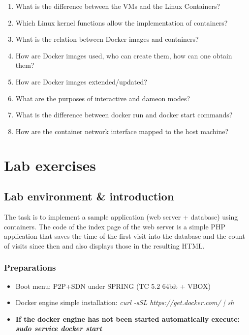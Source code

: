 \documentclass[a4paper]{article}
\begin{document}
\begin{enumerate}
    \item What is the difference between the VMs and the Linux Containers?
    \item Which Linux kernel functions allow the implementation of containers?
    \item What is the relation between Docker images and containers?
    \item How are Docker images used, who can create them, how can one obtain them?
    \item How are Docker images extended/updated?
    \item What are the purposes of interactive and dameon modes?
    \item What is the difference between docker run and docker start commands?
    \item How are the container network interface mapped to the host machine?
\end{enumerate}

\section{Lab exercises}

\subsection{Lab environment \& introduction}

The task is to implement a sample application (web server + database) using containers. The code of the index page of
the web server is a simple PHP application that saves the time of the first visit into the database and the count of
visits since then and also displays those in the resulting HTML.

\subsubsection{Preparations}
\begin{itemize}

    \item Boot menu: P2P+SDN under SPRING (TC 5.2 64bit + VBOX)

    \item Docker engine simple installation: \emph{curl -sSL https://get.docker.com/ | sh}

    \item \textbf{If the docker engine has not been started automatically execute: \emph{sudo service docker start}}

\end{itemize}
\end{document}
